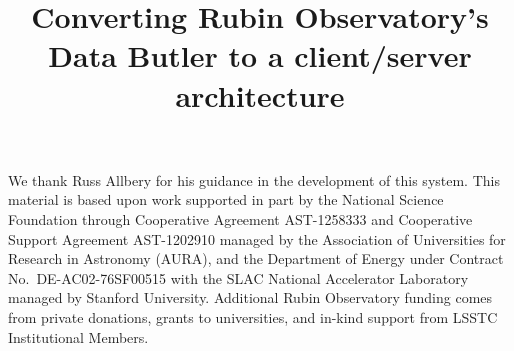\documentclass[]{spie}
\begin{document}

\title{Converting Rubin Observatory's Data Butler to a client/server architecture}

\maketitle





\acknowledgments

We thank Russ Allbery for his guidance in the development of this system.
This material is based upon work supported in part by the National Science Foundation through Cooperative Agreement AST-1258333 and Cooperative Support Agreement AST-1202910 managed by the Association of Universities for Research in Astronomy (AURA), and the Department of Energy under Contract No.\ DE-AC02-76SF00515 with the SLAC National Accelerator Laboratory managed by Stanford University.
Additional Rubin Observatory funding comes from private donations, grants to universities, and in-kind support from LSSTC Institutional Members.



\end{document}
